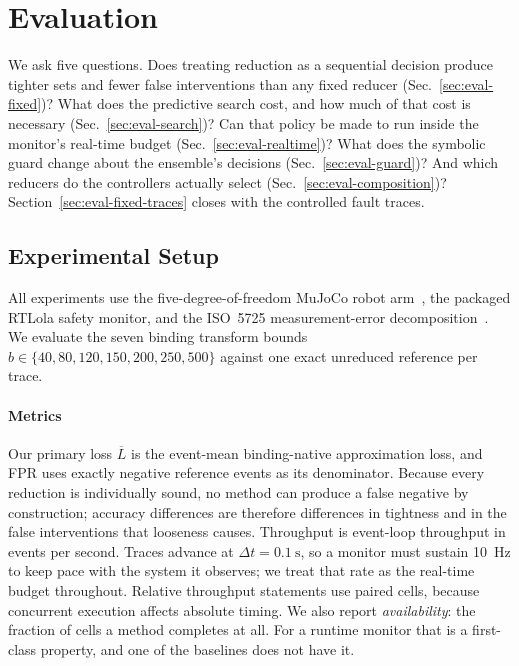 \documentclass[letterpaper, 10 pt, conference]{ieeeconf}  %
\begin{document}
\section{Evaluation}
\label{sec:evaluation}
We ask five questions.
Does treating reduction as a sequential decision produce tighter sets and fewer false interventions than any fixed reducer (Sec.~\ref{sec:eval-fixed})?
What does the predictive search cost, and how much of that cost is necessary (Sec.~\ref{sec:eval-search})?
Can that policy be made to run inside the monitor's real-time budget (Sec.~\ref{sec:eval-realtime})?
What does the symbolic guard change about the ensemble's decisions (Sec.~\ref{sec:eval-guard})?
And which reducers do the controllers actually select (Sec.~\ref{sec:eval-composition})?
Section~\ref{sec:eval-fixed-traces} closes with the controlled fault traces.

\subsection{Experimental Setup}
\label{sec:experimental-setup}
All experiments use the five-degree-of-freedom MuJoCo robot arm~\cite{todorov2012mujoco}, the packaged RTLola safety monitor, and the ISO~5725 measurement-error decomposition~\cite{iso5725-1-2023}.
We evaluate the seven binding transform bounds $b\in\{40,80,120,150,200,250,500\}$ against one exact unreduced reference per trace.

\paragraph{Metrics}
Our primary loss $\overline{L}$ is the event-mean binding-native approximation loss, and FPR uses exactly negative reference events as its denominator.
Because every reduction is individually sound, no method can produce a false negative by construction; accuracy differences are therefore differences in tightness and in the false interventions that looseness causes.
Throughput is event-loop throughput in events per second.
Traces advance at $\Delta t = \SI{0.1}{\second}$, so a monitor must sustain \SI{10}{\hertz} to keep pace with the system it observes; we treat that rate as the real-time budget throughout.
Relative throughput statements use paired cells, because concurrent execution affects absolute timing.
We also report \emph{availability}: the fraction of cells a method completes at all.
For a runtime monitor that is a first-class property, and one of the baselines does not have it.
\end{document}

